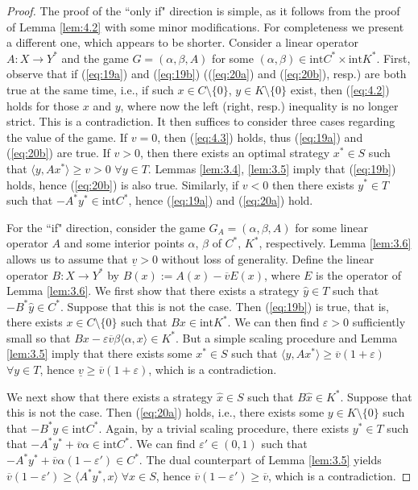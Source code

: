 \documentclass[11pt, twoside]{article}
\numberwithin{equation}{section}
\theoremstyle{definition}
\begin{document}
\begin{proof}
    The proof of the ``only if" direction is simple, as it follows from the proof of Lemma \ref{lem:4.2} with some minor modifications. For completeness we present a different one, which appears to be shorter. Consider a linear operator $A:X\rightarrow Y^*$ and the game $G=(\alpha,\beta,A)$ for some $(\alpha,\beta)\in\text{int}C^*\times\text{int}K^*$. First, observe that if (\ref{eq:19a}) and (\ref{eq:19b}) ((\ref{eq:20a}) and (\ref{eq:20b}), resp.) are both true at the same time, i.e., if such $x\in C\setminus\{0\}$, $y\in K\setminus\{0\}$ exist, then (\ref{eq:4.2}) holds for those $x$ and $y$, where now the left (right, resp.) inequality is no longer strict. This is a contradiction. It then suffices to consider three cases regarding the value of the game. If $v=0$, then (\ref{eq:4.3}) holds, thus (\ref{eq:19a}) and (\ref{eq:20b}) are true. If $v>0$, then there exists an optimal strategy $x^*\in S$ such that $\langle y,Ax^*\rangle\geq v>0$ $\forall y\in T$. Lemmas \ref{lem:3.4}, \ref{lem:3.5} imply that (\ref{eq:19b}) holds, hence (\ref{eq:20b}) is also true. Similarly, if $v<0$ then there exists $y^*\in T$ such that $-A^*y^*\in\text{int}C^*$, hence (\ref{eq:19a}) and (\ref{eq:20a}) hold.\par
     For the ``if" direction, consider the game $G_A=(\alpha,\beta,A)$ for some linear operator $A$ and some interior points $\alpha$, $\beta$ of $C^*$, $K^*$, respectively. Lemma \ref{lem:3.6} allows us to assume that $\underline{v}>0$ without loss of generality. Define the linear operator $B:X\rightarrow Y^*$ by $B(x):= A(x)-\overline{v}E(x)$, where $E$ is the operator of Lemma \ref{lem:3.6}. We first show that there exists a strategy $\hat{y}\in T$ such that $-B^*\hat{y}\in C^*$. Suppose that this is not the case. Then (\ref{eq:19b}) is true, that is, there exists $x\in C\setminus\{0\}$ such that $Bx\in \text{int}K^*$. We can then find $\varepsilon>0$ sufficiently small so that $Bx-\varepsilon\overline{v}\beta\langle\alpha,x\rangle\in K^*$. But a simple scaling procedure and Lemma \ref{lem:3.5} imply that there exists some $x^*\in S$ such that $\langle y,Ax^*\rangle\geq\overline{v}(1+\varepsilon)$ $\forall y\in T$, hence $\underline{v}\geq\overline{v}(1+\varepsilon)$, which is a contradiction.\par
    We next show that there exists a strategy $\hat{x}\in S$ such that $B\hat{x}\in K^*$. Suppose that this is not the case. Then (\ref{eq:20a}) holds, i.e., there exists some $y\in K\setminus\{0\}$ such that $-B^*y\in \text{int}C^*$. Again, by a trivial scaling procedure, there exists $y^*\in T$ such that $-A^*y^*+\overline{v}\alpha\in\text{int}C^*$. We can find $\varepsilon'\in(0,1)$ such that $-A^*y^*+\overline{v}\alpha(1-\varepsilon')\in C^*$. The dual counterpart of Lemma \ref{lem:3.5} yields $\overline{v}(1-\varepsilon')\geq\langle A^*y^*,x\rangle\;\forall x\in S$, hence $\overline{v}(1-\varepsilon')\geq\overline{v}$, which is a contradiction.\par

\end{proof}
\end{document}
